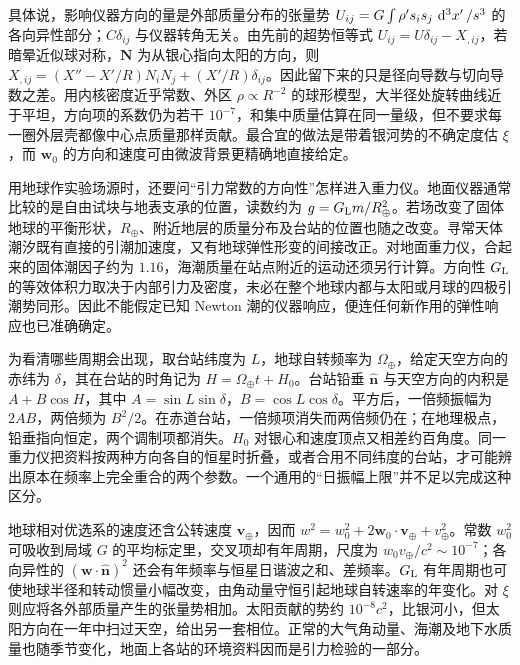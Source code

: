 具体说，影响仪器方向的量是外部质量分布的张量势 $U_{ij}=G\int\rho' s_i s_j\,\dd[3]{x'}/s^3$ 的各向异性部分；$C\delta_{ij}$ 与仪器转角无关。由先前的超势恒等式 $U_{ij}=U\delta_{ij}-X_{,ij}$，若暗晕近似球对称，$\bm N$ 为从银心指向太阳的方向，则 $X_{,ij}=(X''-X'/R)N_iN_j+(X'/R)\delta_{ij}$。因此留下来的只是径向导数与切向导数之差。用内核密度近乎常数、外区 $\rho\propto R^{-2}$ 的球形模型，大半径处旋转曲线近于平坦，方向项的系数仍为若干 $10^{-7}$，和集中质量估算在同一量级，但不要求每一圈外层壳都像中心点质量那样贡献。最合宜的做法是带着银河势的不确定度估 $\xi$，而 $\bm w_0$ 的方向和速度可由微波背景更精确地直接给定。

用地球作实验场源时，还要问“引力常数的方向性”怎样进入重力仪。地面仪器通常比较的是自由试块与地表支承的位置，读数约为 $g=G_{\rm L}m/R_\oplus^2$。若场改变了固体地球的平衡形状，$R_\oplus$、附近地层的质量分布及台站的位置也随之改变。寻常天体潮汐既有直接的引潮加速度，又有地球弹性形变的间接改正。对地面重力仪，合起来的固体潮因子约为 $1.16$，海潮质量在站点附近的运动还须另行计算。方向性 $G_{\rm L}$ 的等效体积力取决于内部引力及密度，未必在整个地球内都与太阳或月球的四极引潮势同形。因此不能假定已知 Newton 潮的仪器响应，便连任何新作用的弹性响应也已准确确定。

为看清哪些周期会出现，取台站纬度为 $L$，地球自转频率为 $\Omega_\oplus$，给定天空方向的赤纬为 $\delta$，其在台站的时角记为 $H=\Omega_\oplus t+H_0$。台站铅垂 $\hat{\bm n}$ 与天空方向的内积是 $A+B\cos H$，其中 $A=\sin L\sin\delta$，$B=\cos L\cos\delta$。平方后，一倍频振幅为 $2AB$，两倍频为 $B^2/2$。在赤道台站，一倍频项消失而两倍频仍在；在地理极点，铅垂指向恒定，两个调制项都消失。$H_0$ 对银心和速度顶点又相差约百角度。同一重力仪把资料按两种方向各自的恒星时折叠，或者合用不同纬度的台站，才可能辨出原本在频率上完全重合的两个参数。一个通用的“日振幅上限”并不足以完成这种区分。

地球相对优选系的速度还含公转速度 $\bm v_\oplus$，因而 $w^2=w_0^2+2\bm w_0\cdot\bm v_\oplus+v_\oplus^2$。常数 $w_0^2$ 可吸收到局域 $G$ 的平均标定里，交叉项却有年周期，尺度为 $w_0v_\oplus/c^2\sim10^{-7}$；各向异性的 $(\bm w\cdot\hat{\bm n})^2$ 还会有年频率与恒星日谐波之和、差频率。$G_{\rm L}$ 有年周期也可使地球半径和转动惯量小幅改变，由角动量守恒引起地球自转速率的年变化。对 $\xi$ 则应将各外部质量产生的张量势相加。太阳贡献的势约 $10^{-8}c^2$，比银河小，但太阳方向在一年中扫过天空，给出另一套相位。正常的大气角动量、海潮及地下水质量也随季节变化，地面上各站的环境资料因而是引力检验的一部分。

